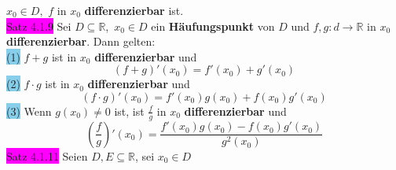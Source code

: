 \documentclass[landscape, 10pt]{article}
\newcommand{\R}{\mathbb{R}}
\begin{document}
\begin{multicols}{3}
                     $x_0\in D,$
                     \textcolor{NavyBlue}{$f$} in 
                     \textcolor{NavyBlue}{$x_0$} 
                     \textbf{differenzierbar} ist.\\
              \colorbox{magenta}{Satz 4.1.9} 
                     Sei \textcolor{NavyBlue}{$D\subseteq\R$},\,
                     \textcolor{NavyBlue}{$x_0\in D$} 
                     ein \textbf{Häufungspunkt} von 
                     \textcolor{NavyBlue}{$D$} 
                     und \textcolor{NavyBlue}{
                     $f,g:d\longrightarrow\R$} in 
                     \textcolor{NavyBlue}{$x_0$} 
                     \textbf{differenzierbar}. 
                     Dann gelten:\\
                     \colorbox{SkyBlue}{(1)} 
                            \textcolor{NavyBlue}{$f+g$}
                            ist in \textcolor{NavyBlue}{$x_0$} 
                            \textbf{differenzierbar} und 
                            \begin{equation*}
                                   (f+g)'(x_0)=f'(x_0)+g'(x_0)
                            \end{equation*}
                     \colorbox{SkyBlue}{(2)} 
                            \textcolor{NavyBlue}{$f\cdot g$} 
                            ist in \textcolor{NavyBlue}{$x_0$} 
                            \textbf{differenzierbar} und 
                            \begin{equation*}
                                   (f\cdot g)'(x_0)
                                   =f'(x_0)g(x_0)+f(x_0)g'(x_0)
                            \end{equation*}
                     \colorbox{SkyBlue}{(3)} Wenn 
                            \textcolor{NavyBlue}{
                            $g(x_0)\neq0$} ist, ist 
                            \textcolor{NavyBlue}{
                            $\frac{f}{g}$} in 
                            \textcolor{NavyBlue}{$x_0$} 
                            \textbf{differenzierbar} und 
                            \begin{equation*}
                                   (\frac{f}{g})'(x_0)
                                   =\frac{f'(x_0)g(x_0)
                                   -f(x_0)g'(x_0)}{g^2(x_0)}
                            \end{equation*}
              \colorbox{magenta}{Satz 4.1.11}
                     Seien \textcolor{NavyBlue}{$D,E\subseteq\R$}, 
                     sei \textcolor{NavyBlue}{$x_0\in D$}

\end{multicols}
\end{document}
